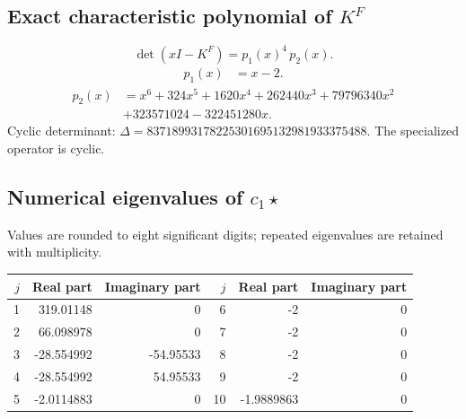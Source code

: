 \documentclass[10pt,a4paper]{article}
\begin{document}
\subsection*{Exact characteristic polynomial of $K^F$}
\[\det(xI-K^F)=p_{1}(x)^{4}\,p_{2}(x).\]
\[\begin{aligned}p_{1}(x)&=x - 2.\end{aligned}\]
\[\begin{aligned}p_{2}(x)&=x^{6} + 324 x^{5} + 1620 x^{4} + 262440 x^{3} + 79796340 x^{2}\\&+323571024 - 322451280 x.\end{aligned}\]
Cyclic determinant: $\Delta=83718993178225301695132981933375488$. The specialized operator is cyclic.
\subsection*{Numerical eigenvalues of $c_1\star$}
Values are rounded to eight significant digits; repeated eigenvalues are retained with multiplicity.
\begin{center}\small\begin{tabular}{rrr@{\qquad}rrr}\toprule $j$ & Real part & Imaginary part & $j$ & Real part & Imaginary part\\\midrule
1 & 319.01148 & 0 & 6 & -2 & 0\\
2 & 66.098978 & 0 & 7 & -2 & 0\\
3 & -28.554992 & -54.95533 & 8 & -2 & 0\\
4 & -28.554992 & 54.95533 & 9 & -2 & 0\\
5 & -2.0114883 & 0 & 10 & -1.9889863 & 0\\
\bottomrule\end{tabular}\end{center}
\end{document}
